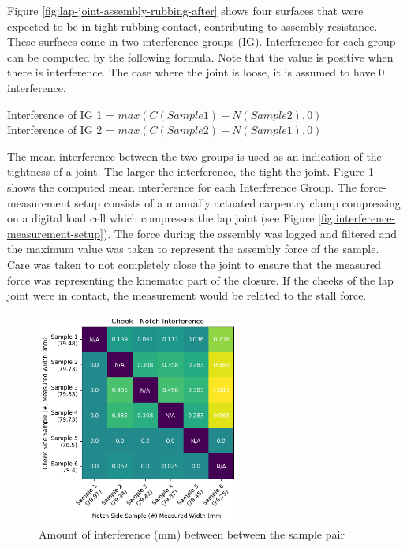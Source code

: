 

Figure \ref{fig:lap-joint-assembly-rubbing-after} shows four surfaces that were expected to be in tight rubbing contact, contributing to assembly resistance. These surfaces come in two interference groups (IG). Interference for each group can be computed by the following formula. Note that the value is positive when there is interference. The case where the joint is loose, it is assumed to have 0 interference.

Interference of IG 1 = $max( C (Sample 1) - N (Sample 2), 0)$\\
Interference of IG 2 = $max( C (Sample 2) - N (Sample 1), 0)$

The mean interference between the two groups is used as an indication of the tightness of a joint. The larger the interference, the tight the joint. Figure \ref{fig:interference-amount} shows the computed mean interference for each Interference Group. The force-measurement setup consists of a manually actuated carpentry clamp compressing on a digital load cell which compresses the lap joint (see Figure \ref{fig:interference-measurement-setup}). The force during the assembly was logged and filtered and the maximum value was taken to represent the assembly force of the sample. Care was taken to not completely close the joint to ensure that the measured force was representing the kinematic part of the closure. If the cheeks of the lap joint were in contact, the measurement would be related to the stall force.

\begin{figure}
    \centering
    \includegraphics[width=0.6\textwidth]{images/04-1+2/tightness-pairwise-size.png}
    \caption{Amount of interference (mm) between between the sample pair}
    \label{fig:interference-amount}
\end{figure}

